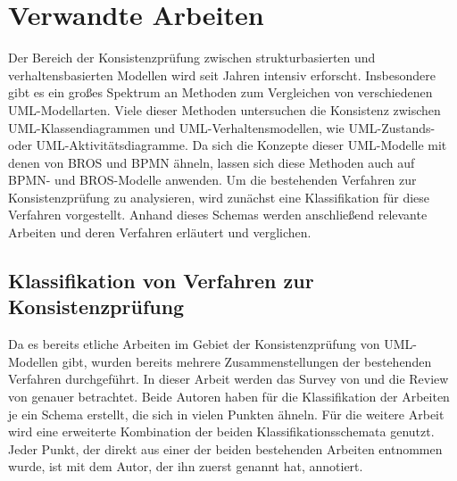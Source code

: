 \chapter{Verwandte Arbeiten}
\label{chap:related_work}

Der Bereich der Konsistenzprüfung zwischen strukturbasierten und verhaltensbasierten Modellen wird seit Jahren intensiv erforscht.
Insbesondere gibt es ein großes Spektrum an Methoden zum Vergleichen von verschiedenen UML-Modellarten.
Viele dieser Methoden untersuchen die Konsistenz zwischen UML-Klassendiagrammen und UML-Verhaltensmodellen, wie UML-Zustands- oder UML-Aktivitätsdiagramme.
Da sich die Konzepte dieser UML-Modelle mit denen von BROS und BPMN ähneln, lassen sich diese Methoden auch auf BPMN- und BROS-Modelle anwenden.
Um die bestehenden Verfahren zur Konsistenzprüfung zu analysieren, wird zunächst eine Klassifikation für diese Verfahren vorgestellt.
Anhand dieses Schemas werden anschließend relevante Arbeiten und deren Verfahren erläutert und verglichen.

\section{Klassifikation von Verfahren zur Konsistenzprüfung}

Da es bereits etliche Arbeiten im Gebiet der Konsistenzprüfung von UML-Modellen gibt, wurden bereits mehrere Zusammenstellungen der bestehenden Verfahren durchgeführt.
In dieser Arbeit werden das Survey von \cite{Usman2008} und die Review von \cite{Lucas2009} genauer betrachtet.
Beide Autoren haben für die Klassifikation der Arbeiten je ein Schema erstellt, die sich in vielen Punkten ähneln.
Für die weitere Arbeit wird eine erweiterte Kombination der beiden Klassifikationsschemata genutzt.
Jeder Punkt, der direkt aus einer der beiden bestehenden Arbeiten entnommen wurde, ist mit dem Autor, der ihn zuerst genannt hat, annotiert.


